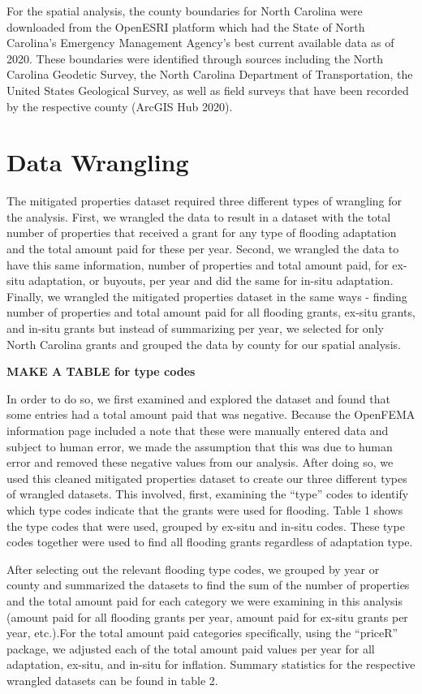 \documentclass[
  12pt,
]{article}
\begin{document}
For the spatial analysis, the county boundaries for North Carolina were
downloaded from the OpenESRI platform which had the State of North
Carolina's Emergency Management Agency's best current available data as
of 2020. These boundaries were identified through sources including the
North Carolina Geodetic Survey, the North Carolina Department of
Transportation, the United States Geological Survey, as well as field
surveys that have been recorded by the respective county (ArcGIS Hub
2020).

\hypertarget{data-wrangling}{%
\section{Data Wrangling}\label{data-wrangling}}

The mitigated properties dataset required three different types of
wrangling for the analysis. First, we wrangled the data to result in a
dataset with the total number of properties that received a grant for
any type of flooding adaptation and the total amount paid for these per
year. Second, we wrangled the data to have this same information, number
of properties and total amount paid, for ex-situ adaptation, or buyouts,
per year and did the same for in-situ adaptation. Finally, we wrangled
the mitigated properties dataset in the same ways - finding number of
properties and total amount paid for all flooding grants, ex-situ
grants, and in-situ grants but instead of summarizing per year, we
selected for only North Carolina grants and grouped the data by county
for our spatial analysis.

\textbf{MAKE A TABLE for type codes}

In order to do so, we first examined and explored the dataset and found
that some entries had a total amount paid that was negative. Because the
OpenFEMA information page included a note that these were manually
entered data and subject to human error, we made the assumption that
this was due to human error and removed these negative values from our
analysis. After doing so, we used this cleaned mitigated properties
dataset to create our three different types of wrangled datasets. This
involved, first, examining the ``type'' codes to identify which type
codes indicate that the grants were used for flooding. Table 1 shows the
type codes that were used, grouped by ex-situ and in-situ codes. These
type codes together were used to find all flooding grants regardless of
adaptation type.

After selecting out the relevant flooding type codes, we grouped by year
or county and summarized the datasets to find the sum of the number of
properties and the total amount paid for each category we were examining
in this analysis (amount paid for all flooding grants per year, amount
paid for ex-situ grants per year, etc.).For the total amount paid
categories specifically, using the ``priceR'' package, we adjusted each
of the total amount paid values per year for all adaptation, ex-situ,
and in-situ for inflation. Summary statistics for the respective
wrangled datasets can be found in table 2.
\end{document}
